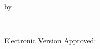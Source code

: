 \pagestyle{empty}
\begin{center}

\\

\vspace{.7in}
by\\
\vspace{.7in}

\\

\end{center}
\vspace{1in}

\hspace{2.6in}

\hspace {2.8in} 

\label{tab:detail_results}


\vspace{0.75in}
\noindent Electronic Version Approved:\\
\vspace{0.25in}


